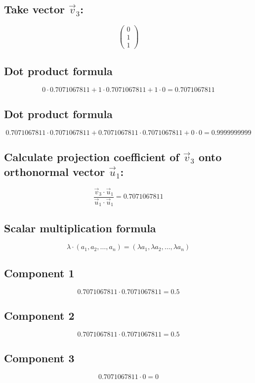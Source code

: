 \documentclass{article}
\begin{document}
\subsection*{ \vspace{1em} Take vector \(\vec{v}_{3}\):}
\[
\begin{pmatrix}0 \\ 1 \\ 1\end{pmatrix}
\]
\subsection*{ \vspace{1em} Dot product formula}
\[
0 \cdot 0.7071067811 + 1 \cdot 0.7071067811 + 1 \cdot 0 = 0.7071067811
\]
\subsection*{ \vspace{1em} Dot product formula}
\[
0.7071067811 \cdot 0.7071067811 + 0.7071067811 \cdot 0.7071067811 + 0 \cdot 0 = 0.9999999999
\]
\subsection*{ \vspace{1em} Calculate projection coefficient of \(\vec{v}_{3}\) onto orthonormal vector \(\vec{u}_{1}\):}
\[
\frac{\vec{v}_{3} \cdot \vec{u}_{1}}{\vec{u}_{1} \cdot \vec{u}_{1}} = 0.7071067811
\]
\subsection*{ \vspace{1em} Scalar multiplication formula}
\[
\lambda \cdot (a_1, a_2, \dots, a_n) = (\lambda a_1, \lambda a_2, \dots, \lambda a_n)
\]
\subsection*{ \vspace{1em} Component 1}
\[
0.7071067811 \cdot 0.7071067811 = 0.5
\]
\subsection*{ \vspace{1em} Component 2}
\[
0.7071067811 \cdot 0.7071067811 = 0.5
\]
\subsection*{ \vspace{1em} Component 3}
\[
0.7071067811 \cdot 0 = 0
\]
\end{document}
